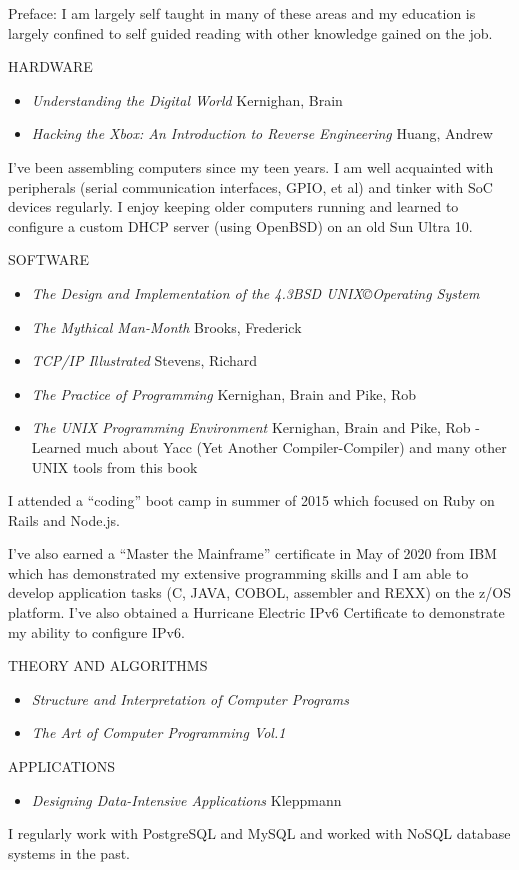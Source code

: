 \documentclass[12pt]{report}
\begin{document}
Preface: I am largely self taught in many of these areas and my education is largely confined to self guided reading with other knowledge gained on the job.\hfill \break

HARDWARE
\begin{itemize}
  \item \emph {Understanding the Digital World} Kernighan, Brain
  \item \emph {Hacking the Xbox: An Introduction to Reverse Engineering} Huang, Andrew
\end{itemize}
I've been assembling computers since my teen years. I am well acquainted with peripherals (serial communication interfaces, GPIO, et al) and tinker with SoC devices regularly. I enjoy keeping older computers running and learned to configure a custom DHCP server (using OpenBSD) on an old Sun Ultra 10.\hfill \break

SOFTWARE
\begin{itemize}
  \item \emph {The Design and Implementation of the 4.3BSD UNIX\copyright Operating System}
  \item \emph {The Mythical Man-Month} Brooks, Frederick
  \item \emph {TCP/IP Illustrated} Stevens, Richard
  \item \emph {The Practice of Programming} Kernighan, Brain and Pike, Rob
  \item \emph {The UNIX Programming Environment} Kernighan, Brain and Pike, Rob - Learned much about Yacc (Yet Another Compiler-Compiler) and many other UNIX tools from this book
\end{itemize}
I attended a ``coding'' boot camp in summer of 2015 which focused on Ruby on Rails and Node.js.

I've also earned a ``Master the Mainframe'' certificate in May of 2020 from IBM which has demonstrated my extensive programming skills and I am able to develop application tasks (C, JAVA, COBOL, assembler and REXX) on the z/OS platform. I've also obtained a Hurricane Electric IPv6 Certificate to demonstrate my ability to configure IPv6.\hfill \break

THEORY AND ALGORITHMS
\begin{itemize}
  \item \emph {Structure and Interpretation of Computer Programs}
  \item \emph {The Art of Computer Programming Vol.1}
\end{itemize}

APPLICATIONS
\begin{itemize}
  \item \emph {Designing Data-Intensive Applications} Kleppmann
\end{itemize}
I regularly work with PostgreSQL and MySQL and worked with NoSQL database systems in the past.
\end{document}
